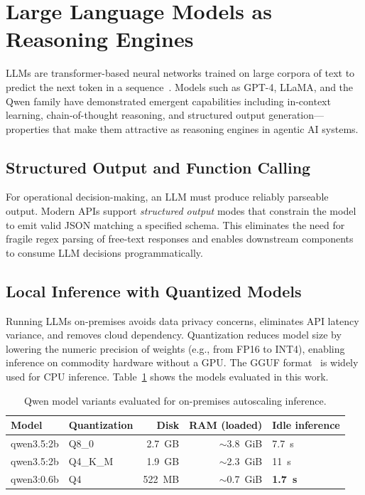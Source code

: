 \section{Large Language Models as Reasoning Engines}
\label{sec:llm-reasoning}

\glspl{LLM} are transformer-based neural networks trained on large corpora of
text to predict the next token in a sequence~\cite{brown2020gpt3}. Models such
as GPT-4, LLaMA, and the Qwen family have demonstrated emergent capabilities
including in-context learning, chain-of-thought reasoning, and structured output
generation—properties that make them attractive as reasoning engines in agentic
AI systems.

\subsection{Structured Output and Function Calling}
For operational decision-making, an LLM must produce reliably parseable output.
Modern APIs support \textit{structured output} modes that constrain the model
to emit valid JSON matching a specified schema. This eliminates the need for
fragile regex parsing of free-text responses and enables downstream components
to consume LLM decisions programmatically.

\subsection{Local Inference with Quantized Models}
Running LLMs on-premises avoids data privacy concerns, eliminates API latency
variance, and removes cloud dependency. Quantization reduces model size by
lowering the numeric precision of weights (e.g., from FP16 to INT4), enabling
inference on commodity hardware without a GPU. The GGUF format~\cite{ggml2023}
is widely used for CPU inference. Table~\ref{tab:model-sizes} shows the models
evaluated in this work.

\begin{table}[h]
  \centering
  \caption{Qwen model variants evaluated for on-premises autoscaling inference.}
  \label{tab:model-sizes}
  \begin{tabular}{llrrl}
    \toprule
    Model & Quantization & Disk & RAM (loaded) & Idle inference \\
    \midrule
    qwen3.5:2b  & Q8\_0 & 2.7~GB & $\sim$3.8~GiB & 7.7~s \\
    qwen3.5:2b  & Q4\_K\_M & 1.9~GB & $\sim$2.3~GiB & 11~s \\
    qwen3:0.6b  & Q4   & 522~MB & $\sim$0.7~GiB & \textbf{1.7~s} \\
    \bottomrule
  \end{tabular}
\end{table}

